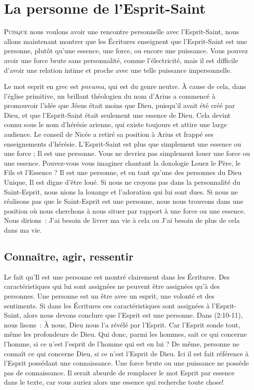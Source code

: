 \chapter{La personne de l'Esprit-Saint}

\lettrine[lines=3]{P}{uisque} nous voulons avoir une rencontre personnelle avec
 l'Esprit-Saint, nous allons maintenant montrer que les Écritures enseignent
 que l'Esprit-Saint est une personne, plutôt qu'une essence, une force, ou
 encore une puissance. Vous pouvez avoir une force brute sans personnalité,
 comme l'électricité, mais il est difficile d'avoir une relation intime et
 proche avec une telle puissance impersonnelle.

Le mot \og esprit \fg{} en grec est \emph{pneuma}, qui est du genre neutre.
 À cause de cela, dans l'église primitive, un brillant théologien du nom
 d'Arius a commencé à promouvoir l'idée que Jésus était moins que Dieu,
 puisqu'il avait été créé par Dieu, et que l'Esprit-Saint était seulement
 une \og essence \fg{} de Dieu. Cela devint connu sous le nom d'hérésie
 arienne, qui existe toujours et attire une large audience. Le conseil de
 Nicée a retiré sa position à Arius et frappé ses enseignements d'hérésie.
 L'Esprit-Saint est plus que simplement une essence ou une force ; Il est
 une personne. Vous ne devriez pas simplement louer une force ou une essence.
 Pouvez-vous vous imaginer chantant la doxologie \og Louez le Père, le Fils
 et l'Essence \fg{} ? Il est une personne, et en tant qu'une des personnes
 du Dieu Unique, Il est digne d'être loué. Si nous ne croyons pas dans la
 personnalité du Saint-Esprit, nous nions la louange et l'adoration qui lui
 sont dues. Si nous ne réalisons pas que le Saint-Esprit est une personne,
 nous nous trouvons dans une position où nous cherchons à nous situer par
 rapport à une force ou une essence. Nous dirions~: \og J'ai besoin de livrer
 ma vie à cela \fg{} ou \og J'ai besoin de plus de cela dans ma vie.\fg


\section*{Connaître, agir, ressentir}

Le fait qu'Il est une personne est montré clairement dans les Écritures.
 Des caractéristiques qui lui sont assignées ne peuvent être assignées
 qu'à des personnes. Une personne est un être avec un esprit, une volonté et
 des sentiments. Si dans les Écritures ces caractéristiques sont assignées à
 l'Esprit-Saint, alors nous devons conclure que l'Esprit est une personne.
 Dans (2:10-11), nous lisons~: \og À nous, Dieu nous l'a
 révélé par l'Esprit. Car l'Esprit sonde tout, même les profondeurs de Dieu.
 Qui donc, parmi les hommes, sait ce qui concerne l'homme, si ce n'est
 l'esprit de l'homme qui est en lui ? De même, personne ne connaît ce qui
 concerne Dieu, si ce n'est l'Esprit de Dieu. \fg{} Ici il est fait référence
 à l'Esprit possédant une connaissance. Une force brute ou une puissance ne
 possède pas de connaissance. Il serait absurde de remplacer le mot
 \og Esprit \fg{} par \og essence \fg{} dans le texte, car vous auriez alors
 une \og essence \fg{} qui recherche toute chose!

